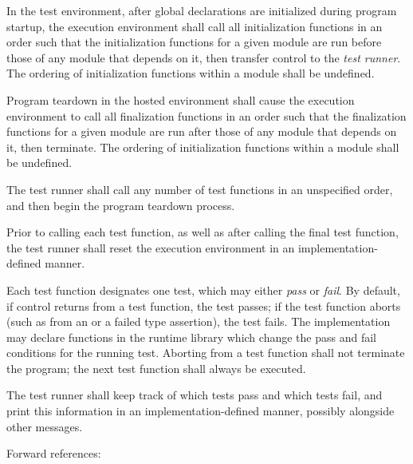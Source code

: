 \specsubsubitem
In the test environment, after global declarations are initialized during
program startup, the execution environment shall call all initialization
functions in an order such that the initialization functions for a given
module are run before those of any module that depends on it, then transfer
control to the \textit{test runner}. The ordering of initialization functions
within a module shall be undefined.

\specsubsubitem
Program teardown in the hosted environment shall cause the execution environment
to call all finalization functions in an order such that the finalization
functions for a given module are run after those of any module that depends on
it, then terminate. The ordering of initialization functions within a module
shall be undefined.

\specsubsubitem
The test runner shall call any number of test functions in an unspecified order,
and then begin the program teardown process.


\specsubsubitem
Prior to calling each test function, as well as after calling the final test
function, the test runner shall reset the execution environment in an
implementation-defined manner.


\specsubsubitem
Each test function designates one test, which may either \textit{pass} or
\textit{fail}. By default, if control returns from a test function, the test
passes; if the test function aborts (such as from an
 or a failed type assertion), the test fails.
The implementation may declare functions in the runtime library which change the
pass and fail conditions for the running test. Aborting from a test function
shall not terminate the program; the next test function shall always be
executed.

\specsubsubitem
The test runner shall keep track of which tests pass and which tests fail, and
print this information in an implementation-defined manner, possibly alongside
other messages.

Forward references: 


